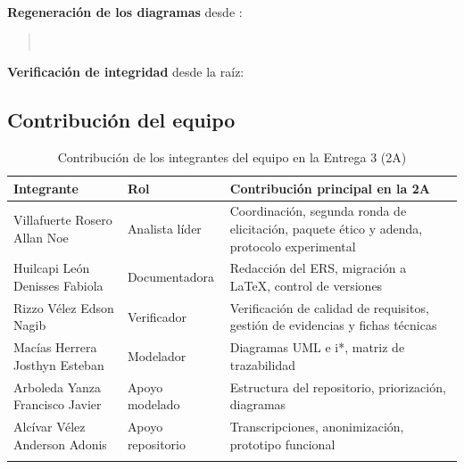 \noindent
\textbf{Regeneración de los diagramas} desde :

\begin{quote}
\\
\end{quote}

\noindent
\textbf{Verificación de integridad} desde la raíz: 

\subsection{Contribución del equipo}

\begin{longtable}{|L{4.4cm}|L{4.0cm}|L{6.8cm}|}
\hline
{}\textbf{Integrante} & \textbf{Rol} & \textbf{Contribución principal en la 2A} \\
\hline
\endhead
Villafuerte Rosero Allan Noe & Analista líder & Coordinación, segunda ronda de elicitación, paquete ético y adenda, protocolo experimental \\ \hline
Huilcapi León Denisses Fabiola & Documentadora & Redacción del ERS, migración a \LaTeX, control de versiones \\ \hline
Rizzo Vélez Edson Nagib & Verificador & Verificación de calidad de requisitos, gestión de evidencias y fichas técnicas \\ \hline
Macías Herrera Josthyn Esteban & Modelador & Diagramas UML e i*, matriz de trazabilidad \\ \hline
Arboleda Yanza Francisco Javier & Apoyo modelado & Estructura del repositorio, priorización, diagramas \\ \hline
Alcívar Vélez Anderson Adonis & Apoyo repositorio & Transcripciones, anonimización, prototipo funcional \\ \hline
\caption{Contribución de los integrantes del equipo en la Entrega 3 (2A)}
\end{longtable}



